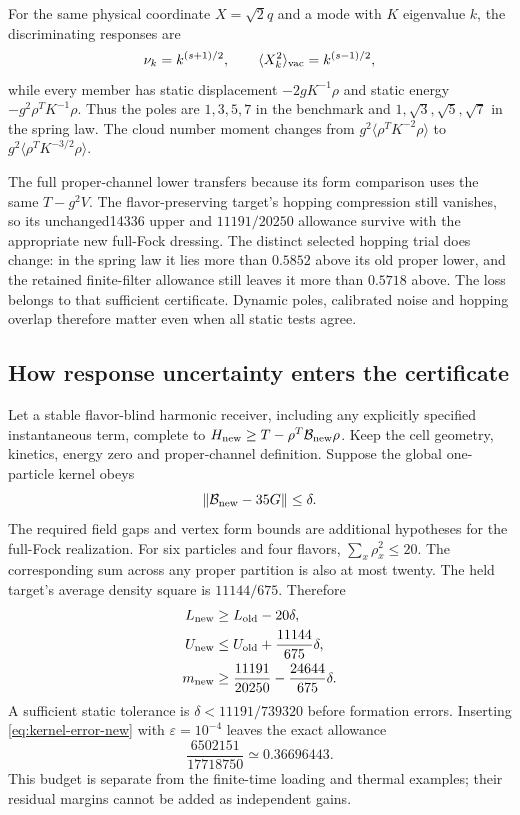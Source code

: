 For the same physical coordinate $X=\sqrt2q$ and a mode with $K$ eigenvalue
$k$, the discriminating responses are
\begin{equation}
\nu_k=k^{(s+1)/2},\qquad
\langle X_k^2\rangle_{\rm vac}=k^{(s-1)/2},
\end{equation}
while every member has static displacement $-2gK^{-1}\rho$ and static
energy $-g^2\rho^TK^{-1}\rho$. Thus the poles are $1,3,5,7$ in the
benchmark and $1,\sqrt3,\sqrt5,\sqrt7$ in the spring law. The cloud number
moment changes from $g^2\langle\rho^TK^{-2}\rho\rangle$ to
$g^2\langle\rho^TK^{-3/2}\rho\rangle$.

The full proper-channel lower transfers because its form comparison uses
the same $T-g^2V$. The flavor-preserving target's hopping compression still
vanishes, so its unchanged14336 upper and $11191/20250$ allowance survive
with the appropriate new full-Fock dressing. The distinct selected hopping
trial does change: in the spring law it lies more than $0.5852$ above its
old proper lower, and the retained finite-filter allowance still leaves it
more than $0.5718$ above. The loss belongs to that sufficient certificate.
Dynamic poles, calibrated noise and hopping overlap therefore matter even
when all static tests agree.

\subsection{How response uncertainty enters the certificate}

Let a stable flavor-blind harmonic receiver, including any explicitly
specified instantaneous term, complete to
$H_{\rm new}\geq T-\rho^T\mathcal B_{\rm new}\rho$. Keep the cell geometry,
kinetics, energy zero and proper-channel definition. Suppose the global
one-particle kernel obeys
\begin{equation}
\|\mathcal B_{\rm new}-35G\|\leq\delta.
\end{equation}
The required field gaps and vertex form bounds are additional hypotheses
for the full-Fock realization. For six particles and four flavors,
$\sum_x\rho_x^2\leq20$. The corresponding sum across any proper partition
is also at most twenty. The held target's average density square is
$11144/675$. Therefore
\begin{align}
L_{\rm new}&\geq L_{\rm old}-20\delta,\\
U_{\rm new}&\leq U_{\rm old}+\frac{11144}{675}\delta,\\
m_{\rm new}&\geq\frac{11191}{20250}-\frac{24644}{675}\delta.
\label{eq:robust-margin-new}
\end{align}
A sufficient static tolerance is $\delta<11191/739320$ before formation
errors. Inserting \eqref{eq:kernel-error-new} with $\varepsilon=10^{-4}$
leaves the exact allowance
\begin{equation}
\frac{6502151}{17718750}\simeq0.36696443.
\end{equation}
This budget is separate from the finite-time loading and thermal examples;
their residual margins cannot be added as independent gains.

